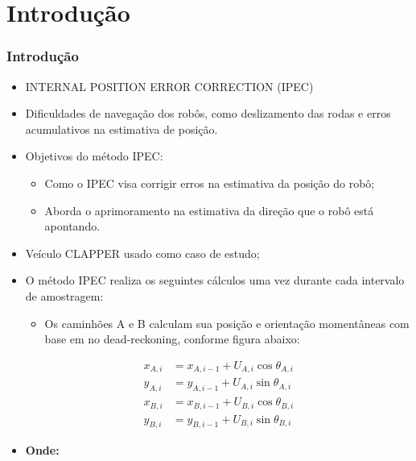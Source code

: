 \documentclass[xcolor=dvipsnames, aspectratio=169]{beamer}
\begin{document}
\section{Introdução}
\begin{frame}
  \frametitle{Introdução}
  \begin{itemize}
    \item INTERNAL POSITION ERROR CORRECTION (IPEC)
    \item Dificuldades de navegação dos robôs, como deslizamento das rodas e erros acumulativos na estimativa de posição.
    \item Objetivos do método IPEC:
      \begin{itemize}
        \item Como o IPEC visa corrigir erros na estimativa da posição do robô;
        \item Aborda o aprimoramento na estimativa da direção que o robô está apontando.
      \end{itemize}
    \item Veículo CLAPPER usado como caso de estudo;
    \item O método IPEC realiza os seguintes cálculos uma vez durante cada intervalo de amostragem: 
    \begin{itemize}
      \item Os caminhões A e B calculam sua posição e orientação momentâneas com base em
      no dead-reckoning, conforme figura abaixo:
    \end{itemize}

    \newpage
    \begin{align}
      x_{A,i} &= x_{A,i-1} + U_{A,i} \cos \theta_{A,i} \\
      y_{A,i} &= y_{A,i-1} + U_{A,i} \sin \theta_{A,i} \\
      x_{B,i} &= x_{B,i-1} + U_{B,i} \cos \theta_{B,i} \\
      y_{B,i} &= y_{B,i-1} + U_{B,i} \sin \theta_{B,i}
    \end{align}
      
    \item \textbf{Onde:}
      

\end{itemize}
\end{frame}
\end{document}
